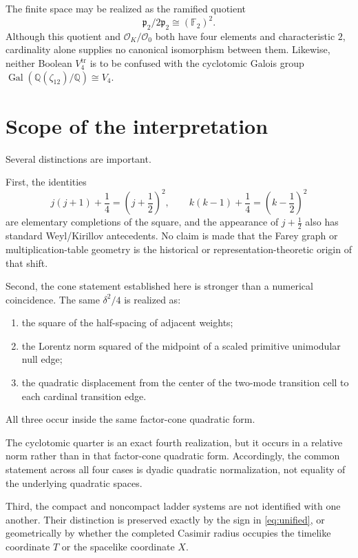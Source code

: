 \documentclass[11pt]{article}
\theoremstyle{remark}
\begin{document}
The finite space may be realized as the ramified quotient
\[
\mathfrak p_2/2\mathfrak p_2\cong(\mathbb F_2)^2.
\]
Although this quotient and $\mathcal O_K/\mathcal O_0$ both have four elements
and characteristic $2$, cardinality alone supplies no canonical isomorphism
between them.  Likewise, neither Boolean $V_4^{\mathrm{tr}}$ is to be confused
with the cyclotomic Galois group
$\operatorname{Gal}(\mathbb Q(\zeta_{12})/\mathbb Q)\cong V_4$.

\section{Scope of the interpretation}

Several distinctions are important.

First, the identities
\[
j(j+1)+\frac14=\left(j+\frac12\right)^2,
\qquad
k(k-1)+\frac14=\left(k-\frac12\right)^2
\]
are elementary completions of the square, and the appearance of $j+\tfrac12$ also has standard Weyl/Kirillov antecedents.  No claim is made that the Farey graph or multiplication-table geometry is the historical or representation-theoretic origin of that shift.

Second, the cone statement established here is stronger than a numerical coincidence.  The same $\delta^2/4$ is realized as:
\begin{enumerate}[label=(\roman*)]
\item the square of the half-spacing of adjacent weights;
\item the Lorentz norm squared of the midpoint of a scaled primitive unimodular null edge;
\item the quadratic displacement from the center of the two-mode transition cell to each cardinal transition edge.
\end{enumerate}
All three occur inside the same factor-cone quadratic form.

The cyclotomic quarter is an exact fourth realization, but it occurs in a
relative norm rather than in that factor-cone quadratic form.  Accordingly,
the common statement across all four cases is dyadic quadratic normalization,
not equality of the underlying quadratic spaces.

Third, the compact and noncompact ladder systems are not identified with one another.  Their distinction is preserved exactly by the sign in \eqref{eq:unified}, or geometrically by whether the completed Casimir radius occupies the timelike coordinate $T$ or the spacelike coordinate $X$.
\end{document}

